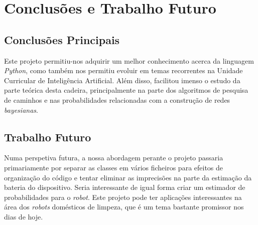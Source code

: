 \chapter{Conclusões e Trabalho Futuro}
\label{chap:conc-trab-futuro}

\section{Conclusões Principais}
\label{sec:conc-princ}

Este projeto permitiu-nos adquirir um melhor conhecimento acerca da linguagem \emph{Python}, como também nos permitiu evoluir em temas recorrentes na Unidade Curricular de Inteligência Artificial. Além disso, facilitou imenso o estudo da parte teórica desta cadeira, principalmente na parte dos algoritmos de pesquisa de caminhos e nas probabilidades relacionadas com a construção de redes \emph{bayesianas}.

\section{Trabalho Futuro}
\label{sec:trab-futuro}

Numa perspetiva futura, a nossa abordagem perante o projeto passaria primariamente por separar as classes em vários ficheiros para efeitos de organização do código e tentar eliminar as imprecisões na parte da estimação da bateria do dispositivo. Seria interessante de igual forma criar um estimador de probabilidades para o \emph{robot}.
Este projeto pode ter aplicações interessantes na área dos \emph{robots} domésticos de limpeza, que é um tema bastante promissor nos dias de hoje.